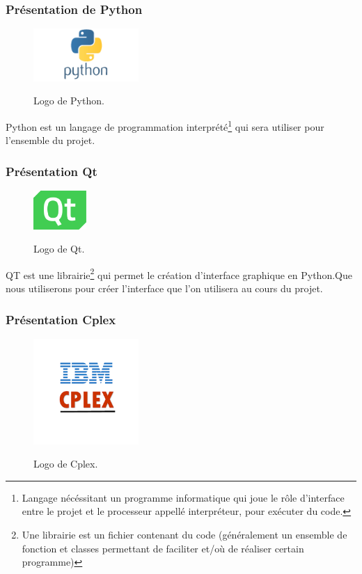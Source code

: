 \subsubsection{Présentation de Python}

\begin{figure}[h]
  \begin{center}
  \includegraphics[width=4cm]{./images/Python_Logo.png}\label{Python}
  \caption{Logo de Python.}
  \end{center}
\end{figure}

Python est un langage de programmation interprété\footnote{\label{interprete}Langage nécéssitant un programme informatique qui joue le rôle d’interface entre le projet et le processeur appellé interpréteur, pour exécuter du code.} qui sera utiliser pour l'ensemble du projet.

\subsubsection{Présentation Qt}

\begin{figure}[h]
  \begin{center}
  \includegraphics[width=2cm]{./images/Qt_logo_2016.png}\label{Qt}
  \caption{Logo de Qt.}
  \end{center}
\end{figure}

QT est une librairie\footnote{\label{librairie}Une librairie est un fichier contenant du code (généralement un ensemble de fonction et classes permettant de faciliter et/où de réaliser certain programme)} qui permet le création d'interface graphique en Python.Que nous utiliserons pour créer l'interface que l'on utilisera au cours du projet.

\subsubsection{Présentation Cplex}

\begin{figure}[h]
  \begin{center}
  \includegraphics[width=4cm]{./images/cplex.png}\label{Cplex}
  \caption{Logo de Cplex.}
  \end{center}
\end{figure}

